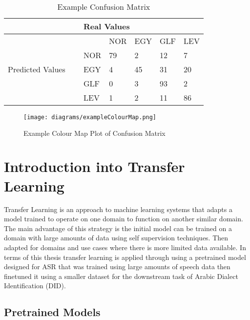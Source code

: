 \begin{table}[h!]
    \centering
    \caption{Example Confusion Matrix}
    \label{tab:conf}
    \begin{tabular}{|l|l|l|l|l|l|} 
    \hline
                                        & \multicolumn{5}{l|}{Real Values}  \\ 
    \hline
    \multirow{5}{*}{Predicted Values~ ~} &     & NOR & EGY & GLF & LEV       \\ 
    \cline{2-6}
                                        & NOR & 79  & 2   & 12  & 7         \\ 
    \cline{2-6}
                                        & EGY & 4   & 45  & 31  & 20        \\ 
    \cline{2-6}
                                        & GLF & 0   & 3   & 93  & 2         \\ 
    \cline{2-6}
                                        & LEV & 1   & 2   & 11  & 86        \\
    \hline
    \end{tabular}
\end{table}

\begin{figure}[h!]
    \centering
    \texttt{[image: diagrams/exampleColourMap.png]}
    \caption{Example Colour Map Plot of Confusion Matrix}
    \label{fig:egcolourmap}
\end{figure}

\section{Introduction into Transfer Learning}\label{sect:trans}
Transfer Learning is an approach to machine learning systems that adapts a model trained to operate on one domain to function on 
another similar domain. The main advantage of this strategy is the initial model can be trained on a domain with large amounts of data 
using self supervision techniques. Then adapted for domains and use cases where there is more limited data available. In terms of this thesis 
transfer learning is applied through using a pretrained model designed for ASR that was trained using large amounts of speech data then finetuned it using a smaller dataset for 
the downstream task of Arabic Dialect Identification (DID). 

\subsection{Pretrained Models}
